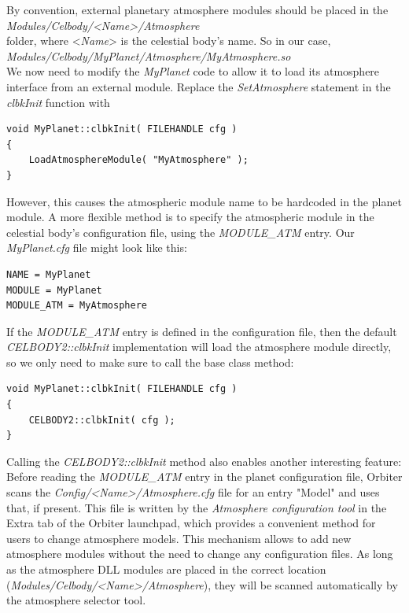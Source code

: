 \documentclass[Orbiter Developer Manual.tex]{subfiles}
\begin{document}
\noindent
By convention, external planetary atmosphere modules should be placed in the\\
\indent \textit{Modules/Celbody/<Name>/Atmosphere}\\
folder, where <\textit{Name}> is the celestial body's name. So in our case,\\
\indent \textit{Modules/Celbody/MyPlanet/Atmosphere/MyAtmosphere.so}\\
We now need to modify the \textit{MyPlanet} code to allow it to load its atmosphere interface from an external module. Replace the \textit{SetAtmosphere} statement in the \textit{clbkInit} function with

\begin{lstlisting}
void MyPlanet::clbkInit( FILEHANDLE cfg )
{
	LoadAtmosphereModule( "MyAtmosphere" );
}
\end{lstlisting}

\noindent
However, this causes the atmospheric module name to be hardcoded in the planet module. A more flexible method is to specify the atmospheric module in the celestial body's configuration file, using the \textit{MODULE\_ATM} entry. Our \textit{MyPlanet.cfg} file might look like this:

\begin{lstlisting}[language=OSFS]
NAME = MyPlanet
MODULE = MyPlanet
MODULE_ATM = MyAtmosphere
\end{lstlisting}

\noindent
If the \textit{MODULE\_ATM} entry is defined in the configuration file, then the default \textit{CELBODY2::clbkInit} implementation will load the atmosphere module directly, so we only need to make sure to call the base class method:

\begin{lstlisting}
void MyPlanet::clbkInit( FILEHANDLE cfg )
{
	CELBODY2::clbkInit( cfg );
}
\end{lstlisting}

\noindent
Calling the \textit{CELBODY2::clbkInit} method also enables another interesting feature: Before reading the \textit{MODULE\_ATM} entry in the planet configuration file, Orbiter scans the \textit{Config/<Name>/Atmosphere.cfg} file for an entry "Model" and uses that, if present. This file is written by the \textit{Atmosphere configuration tool} in the Extra tab of the Orbiter launchpad, which provides a convenient method for users to change atmosphere models. This mechanism allows to add new atmosphere modules without the need to change any configuration files. As long as the atmosphere DLL modules are placed in the correct location (\textit{Modules/Celbody/<Name>/Atmosphere}), they will be scanned automatically by the atmosphere selector tool.
\end{document}
